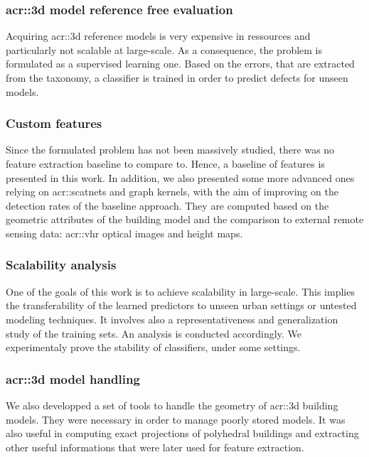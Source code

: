         \subsubsection{\texorpdfstring{\gls*{acr::3d}}{3D} model reference free evaluation}
            Acquiring \gls{acr::3d} reference models is very expensive in ressources and particularly not scalable at large-scale.
            As a consequence, the problem is formulated as a supervised learning one.
            Based on the errors, that are extracted from the taxonomy, a classifier is trained in order to predict defects for unseen models.

        \subsubsection{Custom features}
            Since the formulated problem has not been massively studied, there was no feature extraction baseline to compare to.
            Hence, a baseline of features is presented in this work.
            In addition, we also presented some more advanced ones relying on \glspl{acr::scatnet} and graph kernels, with the aim of improving on the detection rates of the baseline approach.
            They are computed based on the geometric attributes of the building model and the comparison to external remote sensing data: \gls{acr::vhr} optical images and height maps.
        
        \subsubsection{Scalability analysis}
            One of the goals of this work is to achieve scalability in large-scale.
            This implies the transferability of the learned predictors to unseen urban settings or untested modeling techniques.
            It involves also a representativeness and generalization study of the training sets.
            An analysis is conducted accordingly.
            We experimentaly prove the stability of classifiers, under some settings.
        
        \subsubsection{\texorpdfstring{\gls*{acr::3d}}{3D} model handling}
            We also developped a set of tools to handle the geometry of \gls{acr::3d} building models.
            They were necessary in order to manage poorly stored models.
            It was also useful in computing exact projections of polyhedral buildings and extracting other useful informations that were later used for feature extraction.

